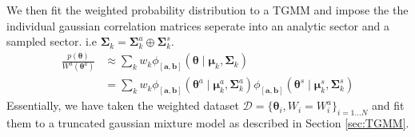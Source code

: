 \documentclass[twocolumn,usenames,dvipsnames,linenumbers]{aastex631}
\newcommand{\btheta}{\boldsymbol{\theta}}
\newcommand{\bSigma}{\boldsymbol{\Sigma}}
\begin{document}
We then fit the weighted probability distribution to a \ac{TGMM} and impose the the individual gaussian correlation matrices seperate into an analytic sector and a sampled sector. i.e $\bSigma_k = \bSigma^a_k \oplus \bSigma^s_k$. 
\begin{equation}
\begin{aligned}
	\frac{p(\btheta)}{W^a(\btheta^a)} &\approx \sum_k w_k \phi_{[\boldsymbol{a},\boldsymbol{b}]}(\btheta \mid \boldsymbol{\mu}_k ,\boldsymbol{\Sigma}_k) \\ &=  \sum_k w_k \phi_{[\boldsymbol{a},\boldsymbol{b}]}(\btheta^a \mid \boldsymbol{\mu}^a_k ,\boldsymbol{\Sigma}^a_k) \phi_{[\boldsymbol{a},\boldsymbol{b}]}(\btheta^s \mid \boldsymbol{\mu}^s_k ,\boldsymbol{\Sigma}^s_k)
\end{aligned}
\end{equation}
Essentially, we have taken the weighted dataset $\mathcal{D} = \{\btheta_i, W_i=W_i^a\}_{i=1\dots N}$ and fit them to a truncated gaussian mixture model as described in Section \ref{sec:TGMM}. 
\end{document}
